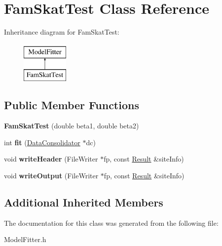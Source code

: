 \hypertarget{classFamSkatTest}{\section{Fam\-Skat\-Test Class Reference}
\label{classFamSkatTest}
}
Inheritance diagram for Fam\-Skat\-Test\-:\begin{figure}[H]
\begin{center}
\leavevmode
\includegraphics[height=2.000000cm]{classFamSkatTest}
\end{center}
\end{figure}
\subsection*{Public Member Functions}
\begin{DoxyCompactItemize}
\item 
\hypertarget{classFamSkatTest_a68834491a02d63ccfcaf93e842f0df51}{{\bfseries Fam\-Skat\-Test} (double beta1, double beta2)}\label{classFamSkatTest_a68834491a02d63ccfcaf93e842f0df51}

\item 
\hypertarget{classFamSkatTest_af01c84ca854dda403f83b90b5f331bc0}{int {\bfseries fit} (\hyperlink{classDataConsolidator}{Data\-Consolidator} $\ast$dc)}\label{classFamSkatTest_af01c84ca854dda403f83b90b5f331bc0}

\item 
\hypertarget{classFamSkatTest_af99548cd85658b926faab311a06fbf04}{void {\bfseries write\-Header} (File\-Writer $\ast$fp, const \hyperlink{classResult}{Result} \&site\-Info)}\label{classFamSkatTest_af99548cd85658b926faab311a06fbf04}

\item 
\hypertarget{classFamSkatTest_a067b0308aff8b331c8d2c8a08d0c6f5e}{void {\bfseries write\-Output} (File\-Writer $\ast$fp, const \hyperlink{classResult}{Result} \&site\-Info)}\label{classFamSkatTest_a067b0308aff8b331c8d2c8a08d0c6f5e}

\end{DoxyCompactItemize}
\subsection*{Additional Inherited Members}


The documentation for this class was generated from the following file\-:\begin{DoxyCompactItemize}
\item 
Model\-Fitter.\-h\end{DoxyCompactItemize}
